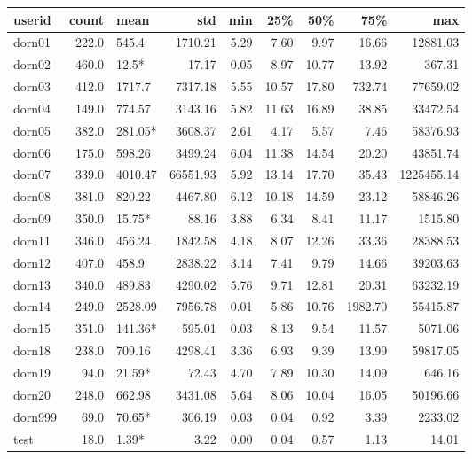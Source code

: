 \begin{tabular}{lrlrrrrrr}
\toprule
  userid &  count &     mean &       std &   min &    25\% &    50\% &      75\% &         max \\
\midrule
  dorn01 &  222.0 &    545.4 &   1710.21 &  5.29 &   7.60 &   9.97 &    16.66 &    12881.03 \\
  dorn02 &  460.0 &    12.5* &     17.17 &  0.05 &   8.97 &  10.77 &    13.92 &      367.31 \\
  dorn03 &  412.0 &   1717.7 &   7317.18 &  5.55 &  10.57 &  17.80 &   732.74 &    77659.02 \\
  dorn04 &  149.0 &   774.57 &   3143.16 &  5.82 &  11.63 &  16.89 &    38.85 &    33472.54 \\
  dorn05 &  382.0 &  281.05* &   3608.37 &  2.61 &   4.17 &   5.57 &     7.46 &    58376.93 \\
  dorn06 &  175.0 &   598.26 &   3499.24 &  6.04 &  11.38 &  14.54 &    20.20 &    43851.74 \\
  dorn07 &  339.0 &  4010.47 &  66551.93 &  5.92 &  13.14 &  17.70 &    35.43 &  1225455.14 \\
  dorn08 &  381.0 &   820.22 &   4467.80 &  6.12 &  10.18 &  14.59 &    23.12 &    58846.26 \\
  dorn09 &  350.0 &   15.75* &     88.16 &  3.88 &   6.34 &   8.41 &    11.17 &     1515.80 \\
  dorn11 &  346.0 &   456.24 &   1842.58 &  4.18 &   8.07 &  12.26 &    33.36 &    28388.53 \\
  dorn12 &  407.0 &    458.9 &   2838.22 &  3.14 &   7.41 &   9.79 &    14.66 &    39203.63 \\
  dorn13 &  340.0 &   489.83 &   4290.02 &  5.76 &   9.71 &  12.81 &    20.31 &    63232.19 \\
  dorn14 &  249.0 &  2528.09 &   7956.78 &  0.01 &   5.86 &  10.76 &  1982.70 &    55415.87 \\
  dorn15 &  351.0 &  141.36* &    595.01 &  0.03 &   8.13 &   9.54 &    11.57 &     5071.06 \\
  dorn18 &  238.0 &   709.16 &   4298.41 &  3.36 &   6.93 &   9.39 &    13.99 &    59817.05 \\
  dorn19 &   94.0 &   21.59* &     72.43 &  4.70 &   7.89 &  10.30 &    14.09 &      646.16 \\
  dorn20 &  248.0 &   662.98 &   3431.08 &  5.64 &   8.06 &  10.04 &    16.05 &    50196.66 \\
 dorn999 &   69.0 &   70.65* &    306.19 &  0.03 &   0.04 &   0.92 &     3.39 &     2233.02 \\
    test &   18.0 &    1.39* &      3.22 &  0.00 &   0.04 &   0.57 &     1.13 &       14.01 \\
\bottomrule
\end{tabular}
